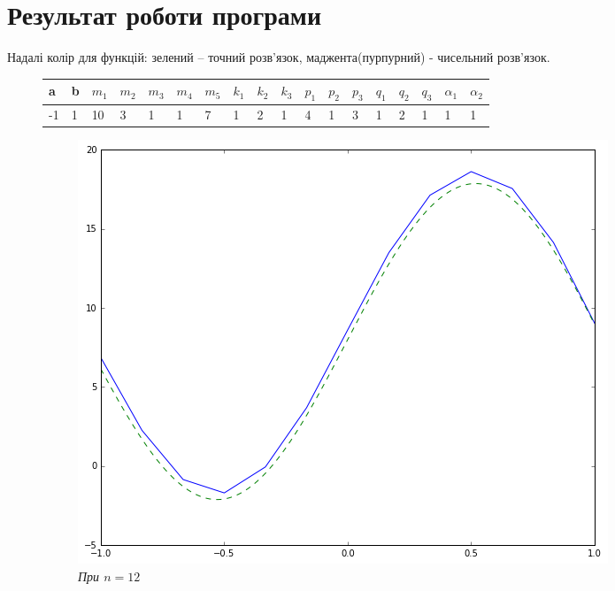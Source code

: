 
\section{Результат роботи програми}

Надалі колір для функцій: зелений -- точний розв'язок, маджента(пурпурний) - чисельний розв'язок.


\begin{figure}[h!]
\begin{center}
    \begin{tabular}{| l | l | l | l | l | l | l | l | l | l | l | l | l | l | l | l | l | l |}
	\hline
	a & b & $m_1$ & $m_2$ & $m_3$ & $m_4$ & $m_5$ & $k_1$ & $k_2$ & $k_3$ & $p_1$ & $p_2$ & $p_3$ & $q_1$ & $q_2$ & $q_3$ & $\alpha_1$ & $\alpha_2$ \\\hline
	-1 & 1 & 10 & 3 & 1 & 1 & 7 & 1 & 2 & 1 & 4 & 1 & 3 & 1 & 2 & 1 & 1 & 1\\ \hline
    \end{tabular}
\end{center}
\bigskip
\centering
\begin{subfigure}{.5\textwidth}
  \centering
  \includegraphics[width=.9\linewidth]{res1_n12}
  \caption{\it При \(n = 12\)}
  \label{fig:sub1}
\end{subfigure}%
\begin{subfigure}{.5\textwidth}

\end{subfigure}
\end{figure}
